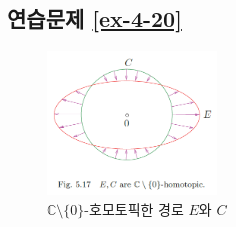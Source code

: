\subsection*{연습문제 \ref{ex-4-20}}













\begin{figure}[h!]
\begin{center}
\includegraphics[width=0.4\textwidth]{./figs/fig-5-17}
\end{center}
\caption{$\mathbb C\setminus \{0\}$-호모토픽한 경로 $E$와 $C$}
\label{fig-5-17}
\end{figure}




 